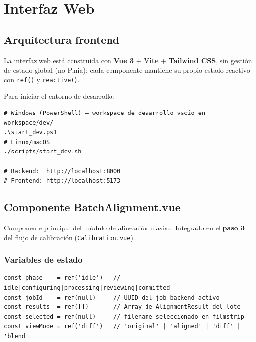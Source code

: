 \chapter{Interfaz Web}
\label{ch:frontend}

\section{Arquitectura frontend}

La interfaz web está construida con \textbf{Vue 3} + \textbf{Vite} + \textbf{Tailwind CSS},
sin gestión de estado global (no Pinia): cada componente mantiene su propio estado reactivo
con \texttt{ref()} y \texttt{reactive()}.

Para iniciar el entorno de desarrollo:

\begin{codebox}[]
\begin{verbatim}
# Windows (PowerShell) — workspace de desarrollo vacío en workspace/dev/
.\start_dev.ps1
# Linux/macOS
./scripts/start_dev.sh

# Backend:  http://localhost:8000
# Frontend: http://localhost:5173
\end{verbatim}
\end{codebox}

\section{Componente BatchAlignment.vue}

Componente principal del módulo de alineación masiva. Integrado en el \textbf{paso 3}
del flujo de calibración (\texttt{Calibration.vue}).

\subsection{Variables de estado}

\begin{codebox}[]
\begin{verbatim}
const phase    = ref('idle')   // idle|configuring|processing|reviewing|committed
const jobId    = ref(null)     // UUID del job backend activo
const results  = ref([])       // Array de AlignmentResult del lote
const selected = ref(null)     // filename seleccionado en filmstrip
const viewMode = ref('diff')   // 'original' | 'aligned' | 'diff' | 'blend'
\end{verbatim}
\end{codebox}

